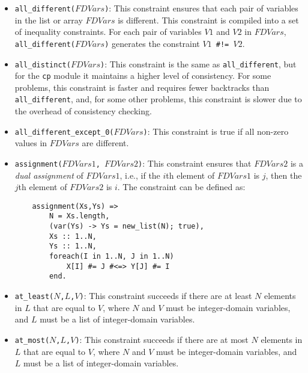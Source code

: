 \begin{itemize}
\item \texttt{all\_different($FDVars$)}: This constraint ensures that each pair of variables in the list or array $FDVars$ is different. This constraint is compiled into a set of inequality constraints. For each pair of variables $V1$ and $V2$ in $FDVars$, \texttt{all\_different($FDVars$)} generates the constraint {\tt $V1$ \verb+#!=+ $V2$}.

\item \texttt{all\_distinct($FDVars$)}: This constraint is the same as \texttt{all\_different}, but for the \texttt{cp} module it maintains a higher level of consistency. For some problems, this constraint is faster and requires fewer backtracks than \texttt{all\_different}, and, for some other problems, this constraint is slower due to the overhead of consistency checking.

\item \texttt{all\_different\_except\_0($FDVars$)}: This constraint is true if all non-zero values in $FDVars$ are different.
\item \texttt{assignment($FDVars1$, $FDVars2$)}: This constraint ensures that $FDVars2$ is a \emph{dual assignment} of $FDVars1$, i.e., if the $i$th element of $FDVars1$ is $j$, then the $j$th element of $FDVars2$ is $i$. The constraint can be defined as:
\begin{verbatim}
    assignment(Xs,Ys) =>
        N = Xs.length,
        (var(Ys) -> Ys = new_list(N); true),
        Xs :: 1..N,
        Ys :: 1..N,
        foreach(I in 1..N, J in 1..N)
            X[I] #= J #<=> Y[J] #= I
        end.
\end{verbatim}

\item \texttt{at\_least($N$,$L$,$V$)}: This constraint succeeds if there are at least $N$ elements in $L$ that are equal to $V$, where $N$ and $V$ must be integer-domain variables, and $L$ must be a list of integer-domain variables.

\item \texttt{at\_most($N$,$L$,$V$)}: This constraint succeeds if there are at most $N$ elements in $L$ that are equal to $V$, where $N$ and $V$ must be integer-domain variables, and $L$ must be a list of integer-domain variables.


\end{itemize}
